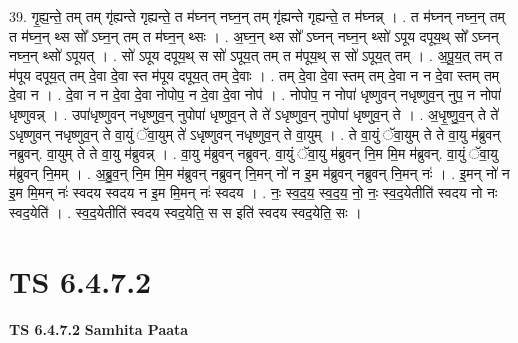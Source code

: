 \documentclass[17pt]{extarticle}
\begin{document}
39. गृ॒ह्य॒न्ते॒ तम् तम् गृ॑ह्यन्ते गृह्यन्ते॒ त म॑घ्नन् नघ्न॒न् तम् गृ॑ह्यन्ते गृह्यन्ते॒ त म॑घ्नन्न् । . त म॑घ्नन् नघ्न॒न् तम् त म॑घ्न॒न् थ्स सो᳚ ऽघ्न॒न् तम् त म॑घ्न॒न् थ्सः । . अ॒घ्न॒न् थ्स सो᳚ ऽघ्नन् नघ्न॒न् थ्सो॑ ऽपूय दपूय॒थ् सो᳚ ऽघ्नन् नघ्न॒न् थ्सो॑ ऽपूयत् । . सो॑ ऽपूय दपूय॒थ् स सो॑ ऽपूय॒त् तम् त म॑पूय॒थ् स सो॑ ऽपूय॒त् तम् । . अ॒पू॒य॒त् तम् त म॑पूय दपूय॒त् तम् दे॒वा दे॒वा स्त म॑पूय दपूय॒त् तम् दे॒वाः । . तम् दे॒वा दे॒वा स्तम् तम् दे॒वा न न दे॒वा स्तम् तम् दे॒वा न । . दे॒वा न न दे॒वा दे॒वा नोपोप॒ न दे॒वा दे॒वा नोप॑ । . नोपोप॒ न नोपा॑ धृष्णुवन् नधृष्णुव॒न् नुप॒ न नोपा॑ धृष्णुवन्न् । . उपा॑धृष्णुवन् नधृष्णुव॒न् नुपोपा॑ धृष्णुव॒न् ते ते॑ ऽधृष्णुव॒न् नुपोपा॑ धृष्णुव॒न् ते । . अ॒धृ॒ष्णु॒व॒न् ते ते॑ ऽधृष्णुवन् नधृष्णुव॒न् ते वा॒युं ॅवा॒युम् ते॑ ऽधृष्णुवन् नधृष्णुव॒न् ते वा॒युम् । . ते वा॒युं ॅवा॒युम् ते ते वा॒यु म॑ब्रुवन् नब्रुवन्. वा॒युम् ते ते वा॒यु म॑ब्रुवन्न् । . वा॒यु म॑ब्रुवन् नब्रुवन्. वा॒युं ॅवा॒यु म॑ब्रुवन् नि॒म मि॒म म॑ब्रुवन्. वा॒युं ॅवा॒यु म॑ब्रुवन् नि॒मम् । . अ॒ब्रु॒व॒न् नि॒म मि॒म म॑ब्रुवन् नब्रुवन् नि॒मन् नो॑ न इ॒म म॑ब्रुवन् नब्रुवन् नि॒मन् नः॑ । . इ॒मन् नो॑ न इ॒म मि॒मन् नः॑ स्वदय स्वदय न इ॒म मि॒मन् नः॑ स्वदय । . नः॒ स्व॒द॒य॒ स्व॒द॒य॒ नो॒ नः॒ स्व॒द॒येतीति॑ स्वदय नो नः स्वद॒येति॑ । . स्व॒द॒येतीति॑ स्वदय स्वद॒येति॒ स स इति॑ स्वदय स्वद॒येति॒ सः । \newline
\pagebreak
{}

\section{ TS 6.4.7.2 }

\textbf{TS 6.4.7.2 } \newline
\textbf{Samhita Paata} \newline
\end{document}
